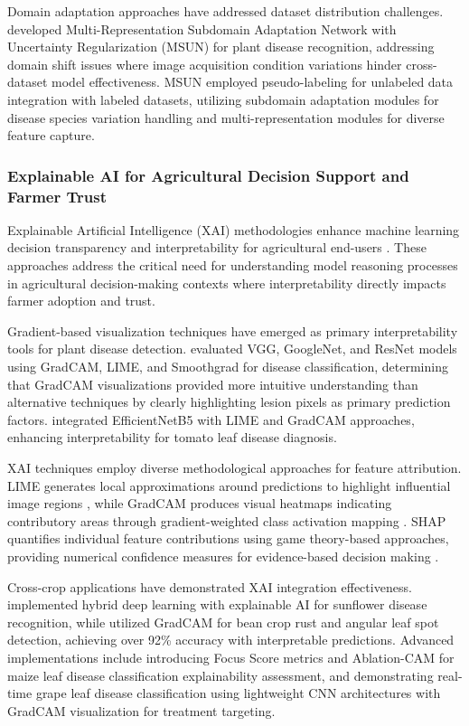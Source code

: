 \documentclass[sn-mathphys]{sn-jnl}
\theoremstyle{thmstyleone}%
\theoremstyle{thmstyletwo}%
\theoremstyle{thmstylethree}%
\begin{document}
Domain adaptation approaches have addressed dataset distribution challenges. \citet{wu2023laboratory} developed Multi-Representation Subdomain Adaptation Network with Uncertainty Regularization (MSUN) for plant disease recognition, addressing domain shift issues where image acquisition condition variations hinder cross-dataset model effectiveness. MSUN employed pseudo-labeling for unlabeled data integration with labeled datasets, utilizing subdomain adaptation modules for disease species variation handling and multi-representation modules for diverse feature capture.


\subsubsection{Explainable AI for Agricultural Decision Support and Farmer Trust}

Explainable Artificial Intelligence (XAI) methodologies enhance machine learning decision transparency and interpretability for agricultural end-users \citep{adadi2018peeking}. These approaches address the critical need for understanding model reasoning processes in agricultural decision-making contexts where interpretability directly impacts farmer adoption and trust.

Gradient-based visualization techniques have emerged as primary interpretability tools for plant disease detection. \citet{wei2022contribution} evaluated VGG, GoogleNet, and ResNet models using GradCAM, LIME, and Smoothgrad for disease classification, determining that GradCAM visualizations provided more intuitive understanding than alternative techniques by clearly highlighting lesion pixels as primary prediction factors. \citet{bhandari2023botanicx} integrated EfficientNetB5 with LIME and GradCAM approaches, enhancing interpretability for tomato leaf disease diagnosis.

XAI techniques employ diverse methodological approaches for feature attribution. LIME generates local approximations around predictions to highlight influential image regions \citep{ribeiro2016should}, while GradCAM produces visual heatmaps indicating contributory areas through gradient-weighted class activation mapping \citep{selvaraju2017grad}. SHAP quantifies individual feature contributions using game theory-based approaches, providing numerical confidence measures for evidence-based decision making \citep{lundberg2017unified}.

Cross-crop applications have demonstrated XAI integration effectiveness. \citet{ghosh2023recognition} implemented hybrid deep learning with explainable AI for sunflower disease recognition, while \citet{elfatimi2023rust} utilized GradCAM for bean crop rust and angular leaf spot detection, achieving over 92\% accuracy with interpretable predictions. Advanced implementations include \citet{quach2025explainable} introducing Focus Score metrics and Ablation-CAM for maize leaf disease classification explainability assessment, and \citet{gharehpasha2024enhanced} demonstrating real-time grape leaf disease classification using lightweight CNN architectures with GradCAM visualization for treatment targeting.
\end{document}

